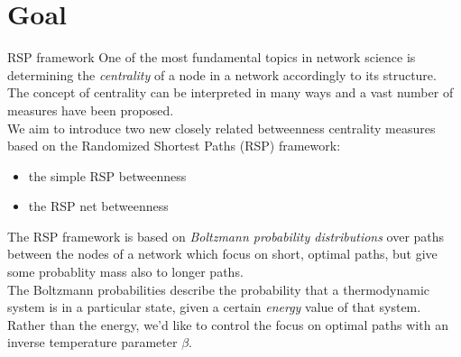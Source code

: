 \documentclass[13pt]{beamer}
\begin{document}
    \section{Goal}

    \begin{frame}[t,allowframebreaks]{RSP framework}
    One of the most fundamental topics in network science is determining the \emph{centrality} of a node in a network accordingly to its structure. The concept of centrality can be interpreted in many ways and a vast number of measures have been proposed.\\
    \vspace{0.8em}
    We aim to introduce two new closely related betweenness centrality measures based on the Randomized Shortest Paths (RSP) framework:
    \begin{itemize}
        \item the simple RSP betweenness

        \item the RSP net betweenness
    \end{itemize}

    \newpage

    The RSP framework is based on \emph{Boltzmann probability distributions} over paths between the nodes of a network which focus on short, optimal paths, but give some probablity mass also to longer paths.\\
    \vspace{0.8em}
    The Boltzmann probabilities describe the probability that a thermodynamic system is in a particular state, given a certain \emph{energy} value of that system.\\
    \vspace{0.8em}
    Rather than the energy, we'd like to control the focus on optimal paths with an inverse temperature parameter $\beta$.
    \end{frame}
\end{document}
